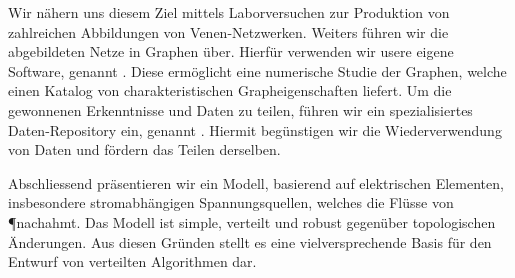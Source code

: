 	Wir n\"ahern uns diesem Ziel mittels Laborversuchen zur Produktion von zahlreichen Abbildungen von Venen-Netzwerken. Weiters f\"uhren wir die abgebildeten Netze in Graphen \"uber. Hierf\"ur verwenden wir usere eigene Software, genannt \NEFI. Diese erm\"oglicht eine numerische Studie der Graphen, welche einen Katalog von charakteristischen Grapheigenschaften liefert. Um die gewonnenen Erkenntnisse und Daten zu teilen, f\"uhren wir ein spezialisiertes Daten-Repository ein, genannt \SMGR. Hiermit beg\"unstigen wir die Wiederverwendung von Daten und f\"ordern das Teilen derselben.

	Abschliessend pr\"asentieren wir ein Modell, basierend auf elektrischen Elementen, insbesondere stromabh\"angigen Spannungsquellen, welches die Fl\"usse von \P nachahmt. Das Modell ist simple, verteilt und robust gegen\"uber topologischen \"Anderungen. Aus diesen Gr\"unden stellt es eine vielversprechende Basis f\"ur den Entwurf von verteilten Algorithmen dar.


\vfill
